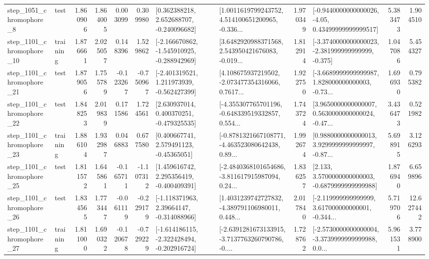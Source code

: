 \begin{tabular}{llrrrrllrlrr}
  step\_1051\_chromophore\_8 &      test &      1.860906 &    1.864005 &      0.003099 &  0.309980 &    [0.362388218, 2.652688707, -0.240096682] &  [1.0011619799243752, 4.514100651200965, -0.336... &       1.970349 &  [-0.9440000000000026, -4.05, 0.43499999999999517] &            5.383473 &          1.904510 \\
 step\_1101\_chromophore\_10 &  training &      1.876661 &    2.025057 &      0.148396 &  1.529862 &  [-2.166670862, -1.545910925, -0.288942969] &  [3.6482920988371568, 2.543950421676083, -0.019... &       1.812914 &  [-3.3740000000000023, -2.381999999999999, -0.375] &            1.047086 &          5.454327 \\
 step\_1101\_chromophore\_21 &      test &      1.879056 &    1.755789 &     -0.123267 & -0.750967 &   [-2.401319521, 1.211973939, -0.562427399] &  [4.108675937219502, -2.073477354316066, 0.7617... &       1.922750 &  [-3.6689999999999987, 1.828000000000003, -0.73... &            1.696930 &          0.795382 \\
 step\_1101\_chromophore\_22 &      test &      1.848253 &    2.019839 &      0.171586 &  1.724561 &    [2.630937014, 0.400370251, -0.479325535] &  [-4.355307765701196, -0.648339519332857, 0.554... &       1.743724 &  [3.9650000000000007, 0.5630000000000024, -0.47... &            3.436473 &          0.521982 \\
 step\_1101\_chromophore\_23 &  training &      1.886104 &    1.932987 &      0.046883 &  0.677580 &     [0.400667741, 2.579491123, -0.45365051] &  [-0.8781321667108771, -4.463523080642438, 0.89... &       1.992674 &  [0.9880000000000013, 3.9299999999999997, -0.87... &            5.698915 &          3.126293 \\
 step\_1101\_chromophore\_25 &      test &      1.811572 &    1.645861 &     -0.165711 & -1.107312 &    [1.459616742, 2.295356419, -0.400409391] &  [-2.4840368101654686, -3.811617915987094, 0.24... &       1.836257 &   [2.133, 3.5700000000000003, -0.6879999999999988] &            1.876940 &          6.659896 \\
 step\_1101\_chromophore\_26 &      test &      1.834565 &    1.773447 &     -0.061119 & -0.229179 &    [-1.118371963, 2.39664147, -0.314088966] &  [1.4031239742727832, -4.389791106980011, 0.448... &       2.017840 &  [-2.119999999999999, 3.617000000000001, -0.344... &            5.719706 &         12.627442 \\
 step\_1101\_chromophore\_27 &  training &      1.811000 &    1.690322 &     -0.120678 & -0.729229 &  [-1.614186115, -2.322428494, -0.202916724] &  [-2.6391281673133915, -3.7137763260790786, -0.... &       1.728762 &  [-2.5730000000000004, -3.3739999999999988, 0.0... &            5.961531 &          3.778900 \\

\end{tabular}
